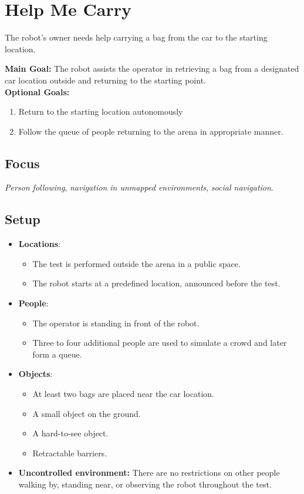 \section{Help Me Carry}\label{test:carry-my-luggage}

The robot's owner needs help carrying a bag from the car to the starting location.

\noindent \textbf{Main Goal:} The robot assists the operator in retrieving a bag from a designated car location outside and returning to the starting point.\\

\noindent \textbf{Optional Goals:}
\begin{enumerate}[nosep]
	\item Return to the starting location autonomously
	\item Follow the queue of people returning to the arena in appropriate manner.
\end{enumerate}

\subsection*{Focus}
\emph{Person following}, \emph{navigation in unmapped environments}, \emph{social navigation}.

\subsection*{Setup}
\begin{itemize}[nosep]
	\item \textbf{Locations}: 
		\begin{itemize}
		 \item The test is performed outside the arena in a public space.
		 \item The robot starts at a predefined location, announced before the test.
		\end{itemize}

	\item \textbf{People}:
	\begin{itemize}[nosep]
		\item The operator is standing in front of the robot.
		\item Three to four additional people are used to simulate a crowd and later form a queue.
	\end{itemize}
	
	\item \textbf{Objects}: 
		\begin{itemize}[nosep]
			\item At least two bags are placed near the car location.
			\item A small object on the ground.
			\item A hard-to-see object.
			\item Retractable barriers.
		\end{itemize}
	
	\item \textbf{Uncontrolled environment:} There are no restrictions on other people walking by, standing near, or observing the robot throughout the test.
\end{itemize}

